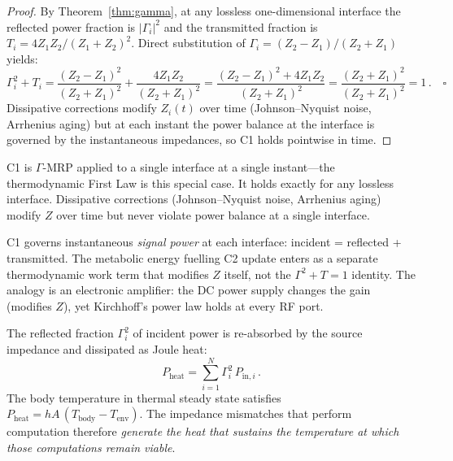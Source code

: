 \documentclass[aps,pre,twocolumn,superscriptaddress,floatfix]{revtex4-2}
\begin{document}
\begin{proof}
By Theorem~\ref{thm:gamma}, at any lossless
one-dimensional interface the reflected power fraction
is $|\Gamma_i|^2$ and the transmitted fraction is
$T_i = 4Z_1 Z_2/(Z_1+Z_2)^2$.
Direct substitution of
$\Gamma_i = (Z_2-Z_1)/(Z_2+Z_1)$ yields:
\begin{equation}
  \Gamma_i^2 + T_i
  = \frac{(Z_2-Z_1)^2}{(Z_2+Z_1)^2}
  + \frac{4Z_1 Z_2}{(Z_2+Z_1)^2}
  = \frac{(Z_2-Z_1)^2 + 4Z_1 Z_2}{(Z_2+Z_1)^2}
  = \frac{(Z_2+Z_1)^2}{(Z_2+Z_1)^2}
  = 1\,. \quad \square
\end{equation}
Dissipative corrections modify $Z_i(t)$ over time
(Johnson--Nyquist noise, Arrhenius aging) but at each
instant the power balance at the interface is governed
by the instantaneous impedances, so C1 holds pointwise
in time.
\end{proof}

\noindent
C1 is $\Gamma$-MRP applied to a single interface
at a single instant---the thermodynamic First Law
is this special case.
It holds exactly for any lossless interface.
Dissipative corrections (Johnson--Nyquist noise,
Arrhenius aging) modify $Z$ over time but never
violate power balance at a single interface.

\begin{remark}
\label{rem:signal-vs-metabolic}
C1 governs instantaneous \emph{signal power} at each
interface: incident = reflected + transmitted.
The metabolic energy fuelling C2 update enters as a
separate thermodynamic work term that modifies $Z$
itself, not the $\Gamma^2 + T = 1$ identity.
The analogy is an electronic amplifier: the DC power
supply changes the gain (modifies $Z$), yet Kirchhoff's
power law holds at every RF port.
\end{remark}

\begin{corollary}
\label{cor:thermal}
The reflected fraction $\Gamma_i^2$ of incident power
is re-absorbed by the source impedance and dissipated
as Joule heat:
\begin{equation}
  P_{\mathrm{heat}} = \sum_{i=1}^{N}
  \Gamma_i^2\,P_{\mathrm{in},i}\,.
  \label{eq:p-heat}
\end{equation}
The body temperature in thermal steady state satisfies
$P_{\mathrm{heat}} = hA\,(T_{\mathrm{body}} -
T_{\mathrm{env}})$.
The impedance mismatches that perform computation
therefore \emph{generate the heat that sustains the
temperature at which those computations remain viable}.
\end{corollary}
\end{document}
